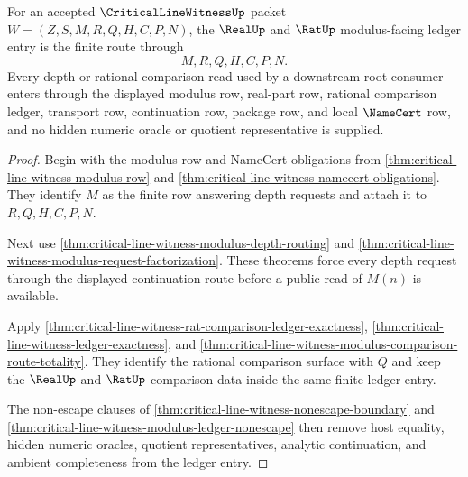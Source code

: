 \begin{theorem}
\label{thm:critical-line-witness-modulus-ledger-entry}
For an accepted $\CriticalLineWitnessUp$ packet $W=(Z,S,M,R,Q,H,C,P,N)$, the $\RealUp$ and $\RatUp$ modulus-facing ledger entry is the finite route through
$$
M,R,Q,H,C,P,N.
$$
Every depth or rational-comparison read used by a downstream root consumer enters through the displayed modulus row, real-part row, rational comparison ledger, transport row, continuation row, package row, and local $\NameCert$ row, and no hidden numeric oracle or quotient representative is supplied.
\end{theorem}
\begin{proof}
Begin with the modulus row and NameCert obligations from \autoref{thm:critical-line-witness-modulus-row} and \autoref{thm:critical-line-witness-namecert-obligations}. They identify $M$ as the finite row answering depth requests and attach it to $R,Q,H,C,P,N$.

Next use \autoref{thm:critical-line-witness-modulus-depth-routing} and \autoref{thm:critical-line-witness-modulus-request-factorization}. These theorems force every depth request through the displayed continuation route before a public read of $M(n)$ is available.

Apply \autoref{thm:critical-line-witness-rat-comparison-ledger-exactness}, \autoref{thm:critical-line-witness-ledger-exactness}, and \autoref{thm:critical-line-witness-modulus-comparison-route-totality}. They identify the rational comparison surface with $Q$ and keep the $\RealUp$ and $\RatUp$ comparison data inside the same finite ledger entry.

The non-escape clauses of \autoref{thm:critical-line-witness-nonescape-boundary} and \autoref{thm:critical-line-witness-modulus-ledger-nonescape} then remove host equality, hidden numeric oracles, quotient representatives, analytic continuation, and ambient completeness from the ledger entry.
\end{proof}

